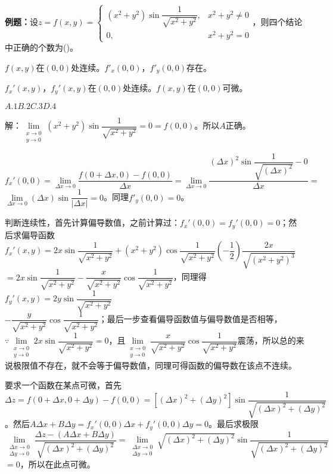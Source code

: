 \documentclass[UTF8, 12pt]{ctexart}
\begin{document}
\textbf{例题：}设$z=f(x,y)=\left\{\begin{array}{ll}
    (x^2+y^2)\sin\dfrac{1}{\sqrt{x^2+y^2}}, & x^2+y^2\neq0 \\
    0, & x^2+y^2=0
\end{array}\right.$，则四个结论中正确的个数为()。

$f(x,y)$在$(0,0)$处连续。\qquad{}$f'_x(0,0)$，$f'_y(0,0)$存在。

$f_x'(x,y)$，$f_y'(x,y)$在$(0,0)$处连续。\qquad{}$f(x,y)$在$(0,0)$可微。

$A.1$\qquad$B.2$\qquad$C.3$\qquad$D.4$

解：$\lim\limits_{\substack{x\to0\\y\to0}}(x^2+y^2)\sin\dfrac{1}{\sqrt{x^2+y^2}}=0=f(0,0)$。所以$A$正确。

$f_x'(0,0)=\lim\limits_{\Delta x\to0}\dfrac{f(0+\Delta x,0)-f(0,0)}{\Delta x}=\lim\limits_{\Delta x\to0}\dfrac{(\Delta x)^2\sin\dfrac{1}{\sqrt{(\Delta x)^2}}-0}{\Delta x}=$\\$\lim\limits_{\Delta x\to0}(\Delta x)\sin\dfrac{1}{\vert\Delta x\vert}=0$。同理$f'_y(0,0)=0$。

判断连续性，首先计算偏导数值，之前计算过：$f_x'(0,0)=f_y'(0,0)=0$；然后求偏导函数$f_x'(x,y)=2x\sin\dfrac{1}{\sqrt{x^2+y^2}}+(x^2+y^2)\cos\dfrac{1}{\sqrt{x^2+y^2}}\left(-\dfrac{1}{2}\right)\dfrac{2x}{\sqrt{(x^2+y^2)^3}}$\\$=2x\sin\dfrac{1}{\sqrt{x^2+y^2}}-\dfrac{x}{\sqrt{x^2+y^2}}\cos\dfrac{1}{\sqrt{x^2+y^2}}$，同理得$f_y'(x,y)=2y\sin\dfrac{1}{\sqrt{x^2+y^2}}$\\$-\dfrac{y}{\sqrt{x^2+y^2}}\cos\dfrac{1}{\sqrt{x^2+y^2}}$；最后一步查看偏导函数值与偏导数值是否相等，$\because\lim\limits_{\substack{x\to0\\y\to0}}2x\sin\dfrac{1}{\sqrt{x^2+y^2}}=0$，且$\lim\limits_{\substack{x\to0\\y\to0}}\dfrac{x}{\sqrt{x^2+y^2}}\cos\dfrac{1}{\sqrt{x^2+y^2}}$震荡，所以总的来说极限值不存在，就不会等于偏导数值，同理可得函数的偏导数在该点不连续。

要求一个函数在某点可微，首先$\Delta z=f(0+\Delta x,0+\Delta y)-f(0,0)=[(\Delta x)^2+(\Delta y)^2]\sin\dfrac{1}{\sqrt{(\Delta x)^2+(\Delta y)^2}}$。然后$A\Delta x+B\Delta y=f_x'(0,0)\Delta x+f_y'(0,0)\Delta y=0$。最后求极限$\lim\limits_{\substack{\Delta x\to0\\\Delta y\to0}}\dfrac{\Delta z-(A\Delta x+B\Delta y)}{\sqrt{(\Delta x)^2+(\Delta y)^2}}=\lim\limits_{\substack{\Delta x\to0\\\Delta y\to0}}\sqrt{(\Delta x)^2+(\Delta y)^2}\sin\dfrac{1}{\sqrt{(\Delta x)^2+(\Delta y)^2}}$\\$=0$，所以在此点可微。
\end{document}
